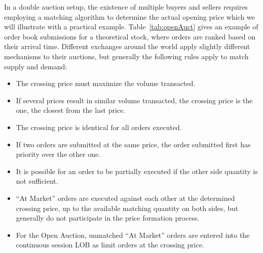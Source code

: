 In a double auction setup, the existence of multiple buyers and sellers requires employing a matching algorithm to determine the actual opening price which we will illustrate with a practical example. Table~\ref{tab:openAuct} gives an example of order book submissions for a theoretical stock, where orders are ranked based on their arrival time. Different exchanges around the world apply slightly different mechanisms to their auctions, but generally the following rules apply to match supply and demand:
        \begin{itemize}
        \item The crossing price must maximize the volume transacted.
        \item If several prices result in similar volume transacted, the crossing price is the one, the closest from the last price. 
        \item The crossing price is identical for all orders executed.
        \item If two orders are submitted at the same price, the order submitted first has priority over the other one.
        \item It is possible for an order to be partially executed if the other side quantity is not sufficient.
        \item ``At Market'' orders are executed against each other at the determined crossing price, up to the available matching quantity on both sides, but generally do not participate in the price formation process.
        \item For the Open Auction, unmatched ``At Market'' orders are entered into the continuous session LOB as limit orders at the crossing price.
        \end{itemize} 


